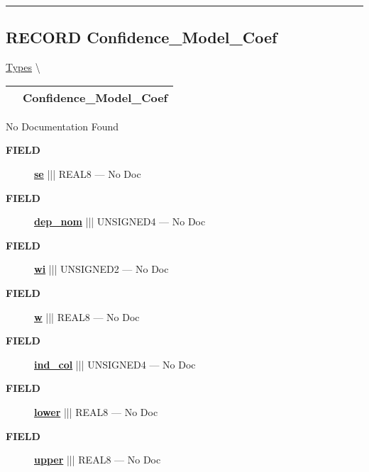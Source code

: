 \rule{\linewidth}{0.5pt}
\subsection*{\textsf{\colorbox{headtoc}{\color{white} RECORD}
Confidence\_Model\_Coef}}

\hypertarget{ecldoc:logisticregression.types.confidence_model_coef}{}
\hspace{0pt} \hyperlink{ecldoc:LogisticRegression.Types}{Types} \textbackslash 

{\renewcommand{\arraystretch}{1.5}
\begin{tabularx}{\textwidth}{|>{\raggedright\arraybackslash}l|X|}
\hline
\hspace{0pt}\mytexttt{\color{red} } & \textbf{Confidence\_Model\_Coef} \\
\hline
\end{tabularx}
}

\par





No Documentation Found







\par
\begin{description}
\item [\colorbox{tagtype}{\color{white} \textbf{\textsf{FIELD}}}] \textbf{\underline{se}} ||| REAL8 --- No Doc
\item [\colorbox{tagtype}{\color{white} \textbf{\textsf{FIELD}}}] \textbf{\underline{dep\_nom}} ||| UNSIGNED4 --- No Doc
\item [\colorbox{tagtype}{\color{white} \textbf{\textsf{FIELD}}}] \textbf{\underline{wi}} ||| UNSIGNED2 --- No Doc
\item [\colorbox{tagtype}{\color{white} \textbf{\textsf{FIELD}}}] \textbf{\underline{w}} ||| REAL8 --- No Doc
\item [\colorbox{tagtype}{\color{white} \textbf{\textsf{FIELD}}}] \textbf{\underline{ind\_col}} ||| UNSIGNED4 --- No Doc
\item [\colorbox{tagtype}{\color{white} \textbf{\textsf{FIELD}}}] \textbf{\underline{lower}} ||| REAL8 --- No Doc
\item [\colorbox{tagtype}{\color{white} \textbf{\textsf{FIELD}}}] \textbf{\underline{upper}} ||| REAL8 --- No Doc
\end{description}





